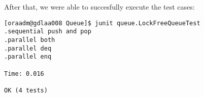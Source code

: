 \hfill
\par
After that, we were able to succesfully execute the test cases:
\par
\hfill
\begin{verbatim}
[oraadm@gdlaa008 Queue]$ junit queue.LockFreeQueueTest
.sequential push and pop
.parallel both
.parallel deq
.parallel enq

Time: 0.016

OK (4 tests)
\end{verbatim}
\hfill
\par
